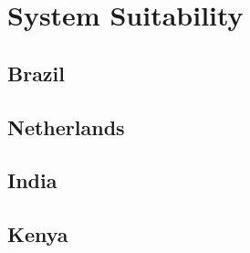 \section{System Suitability}

\subsection{Brazil}

\subsection{Netherlands}

\subsection{India}

\subsection{Kenya}
